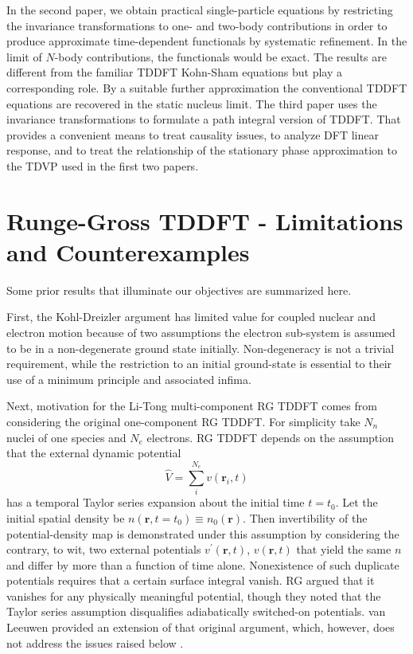 \documentclass[aps,preprint]{revtex4}%
\begin{document}
In the second paper, we obtain practical single-particle equations by
restricting the invariance transformations to one- and two-body contributions
in order to produce approximate time-dependent functionals by systematic
refinement. In the limit of $N$-body contributions, the functionals would be
exact. The results are different from the familiar TDDFT Kohn-Sham equations
but play a corresponding role. By a suitable further approximation the
conventional TDDFT equations are recovered in the static nucleus limit. The
third paper uses the invariance transformations to formulate a path integral
version of TDDFT. That provides a convenient means to treat causality issues,
to analyze DFT linear response, and to treat the relationship of the
stationary phase approximation to the TDVP used in the first two papers.

\section{Runge-Gross TDDFT - Limitations and Counterexamples}

\noindent Some prior results that illuminate our objectives are summarized here.

First, the Kohl-Dreizler argument \cite{KD86} has limited value for coupled
nuclear and electron motion because of two assumptions the electron sub-system
is assumed to be in a non-degenerate ground state initially. Non-degeneracy is
not a trivial requirement, while the restriction to an initial ground-state is
essential to their use of a minimum principle and associated infima.

Next, motivation for the Li-Tong multi-component RG TDDFT comes from
considering the original one-component RG TDDFT. For simplicity take $N_{n}$
nuclei of one species and $N_{e}$ electrons. RG TDDFT depends on the
assumption that the external dynamic potential
\begin{equation}
\hat V = \sum_{i}^{N_{e}} v(\mathbf{r}_{i},t) \label{VextofT}%
\end{equation}
has a temporal Taylor series expansion about the initial time $t=t_{0}$. Let
the initial spatial density be $n(\mathbf{r}, t=t_{0}) \equiv n_{0}%
(\mathbf{r})$. Then invertibility of the potential-density map is demonstrated
under this assumption by considering the contrary, to wit, two external
potentials $v^{\prime}(\mathbf{r},t)$, $v(\mathbf{r},t)$ that yield the same
$n$ and differ by more than a function of time alone. Nonexistence of such
duplicate potentials requires that a certain surface integral vanish. RG
argued that it vanishes for any physically meaningful potential, though they
noted that the Taylor series assumption disqualifies adiabatically switched-on
potentials. van Leeuwen provided an extension of that original argument,
which, however, does not address the issues raised below \cite{Leeuwen99}.
\end{document}
